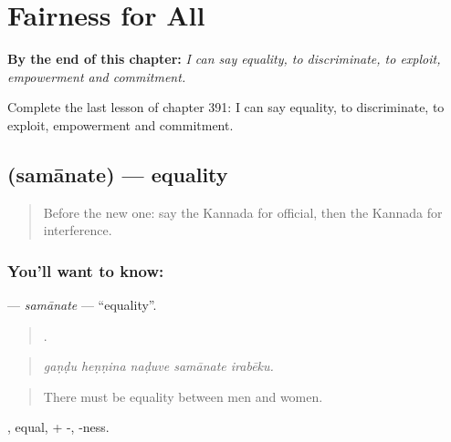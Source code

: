 
\chapter{Fairness for All}
\label{ch:ka-fairness-for-all}

\begin{chapteropening}
\textbf{By the end of this chapter:} \emph{I can say equality, to discriminate, to exploit, empowerment and commitment.}

Complete the last lesson of chapter 391: I can say equality, to discriminate, to exploit, empowerment and commitment.
\end{chapteropening}

\section[\texorpdfstring{\kn{ಸಮಾನತೆ} (samānate)}{ಸಮಾನತೆ (samānate)}]{ (samānate) — equality}

\label{lesson:KA-C391-samanate}



\begin{quote}
Before the new one: say the Kannada for official, then the Kannada for interference.
\end{quote}

\subsection*{You'll want to know: }
\textbf{} — \emph{samānate} — \textquotedblleft{}equality\textquotedblright{}.

\begin{quote}
    .
\end{quote}

\begin{quote}
\emph{gaṇḍu heṇṇina naḍuve samānate irabēku.}
\end{quote}

\begin{quote}
There must be equality between men and women.
\end{quote}

, equal, + -, -ness.

